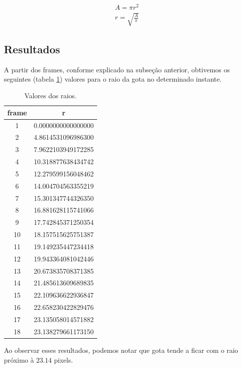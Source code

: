 \documentclass[12pt,a4paper]{article}
\begin{document}
\begin{subequations}
 \label{area}
 \begin{align}
A =  \pi r^2\\
r = \sqrt{\frac{A}{\pi}}
 \end{align}
\end{subequations}

\newpage
\subsection{Resultados}
A partir dos frames, conforme explicado na subseção anterior, obtivemos os seguintes (tabela \ref{raios}) valores para o raio da gota no determinado instante.

\begin{table}[H]
\centering
\caption{Valores dos raios.}
\label{raios}
\begin{tabular}{|c|c|}
\hline
\textbf{frame} & \textbf{r}  \\
\hline
1          & 0.0000000000000000    \\
2          & 4.8614531096986300    \\
3          & 7.9622103949172285    \\
4          & 10.318877638434742    \\
5          & 12.279599156048462    \\
6          & 14.004704563355219    \\
7          & 15.301347744326350    \\
8          & 16.881628115741066    \\
9          & 17.742845371250354    \\
10        & 18.157515625751387    \\
11        & 19.149235447234418    \\
12        & 19.943364081042446    \\
13        & 20.673835708371385    \\
14        & 21.485613609689835    \\
15        & 22.109636622936847    \\
16        & 22.658230422829476    \\
17        & 23.135058014571882    \\
18        & 23.138279661173150  \\
\hline  
\end{tabular}
\end{table}

Ao observar esses resultados, podemos notar que gota tende a ficar com o raio próximo à $23.14$ pixels.
\end{document}
